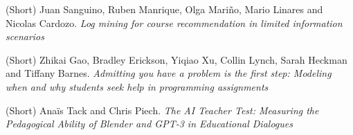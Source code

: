 \documentclass[letterpaper,11pt,oneside]{book} %
\begin{document}
(Short) Juan Sanguino, Ruben Manrique, Olga Mariño, Mario Linares and
Nicolas Cardozo. \emph{Log mining for course recommendation in limited
information scenarios}

(Short) Zhikai Gao, Bradley Erickson, Yiqiao Xu, Collin Lynch, Sarah
Heckman and Tiffany Barnes. \emph{Admitting you have a problem is the first
step: Modeling when and why students seek help in programming
assignments}

(Short) Anaïs Tack and Chris Piech. \emph{The AI Teacher Test: Measuring
the Pedagogical Ability of Blender and GPT-3 in Educational Dialogues}

%
%
%
%
%
%
%
%
\end{document}
